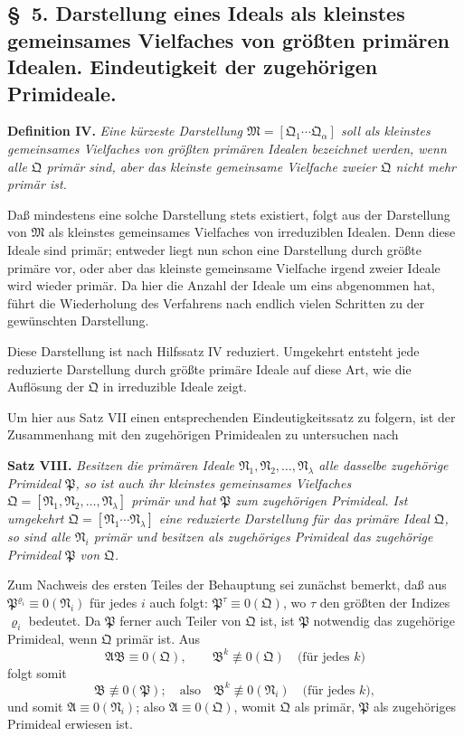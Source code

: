 \documentclass[11pt]{article}
\newcommand{\ideal}[1]{\mathfrak{#1}}
\begin{document}
\subsection*{\S~5. Darstellung eines Ideals als kleinstes gemeinsames Vielfaches von größten primären Idealen. Eindeutigkeit der zugehörigen Primideale.}

\textbf{Definition IV.} \emph{Eine kürzeste Darstellung $\ideal M=[\ideal Q_1\cdots\ideal Q_\alpha]$ soll als kleinstes gemeinsames Vielfaches von größten primären Idealen bezeichnet werden, wenn alle $\ideal Q$ primär sind, aber das kleinste gemeinsame Vielfache zweier $\ideal Q$ nicht mehr primär ist.}

Daß mindestens eine solche Darstellung stets existiert, folgt aus der Darstellung von $\ideal M$ als kleinstes gemeinsames Vielfaches von irreduziblen Idealen. Denn diese Ideale sind primär; entweder liegt nun schon eine Darstellung durch größte primäre vor, oder aber das kleinste gemeinsame Vielfache irgend zweier Ideale wird wieder primär. Da hier die Anzahl der Ideale um eins abgenommen hat, führt die Wiederholung des Verfahrens nach endlich vielen Schritten zu der gewünschten Darstellung.

Diese Darstellung ist nach Hilfssatz IV reduziert. Umgekehrt entsteht jede reduzierte Darstellung durch größte primäre Ideale auf diese Art, wie die Auflösung der $\ideal Q$ in irreduzible Ideale zeigt.

Um hier aus Satz VII einen entsprechenden Eindeutigkeitssatz zu folgern, ist der Zusammenhang mit den zugehörigen Primidealen zu untersuchen nach

\textbf{Satz VIII.} \emph{Besitzen die primären Ideale $\ideal N_1,\ideal N_2,\ldots,\ideal N_\lambda$ alle dasselbe zugehörige Primideal $\ideal P$, so ist auch ihr kleinstes gemeinsames Vielfaches $\ideal Q=[\ideal N_1,\ideal N_2,\ldots,\ideal N_\lambda]$ primär und hat $\ideal P$ zum zugehörigen Primideal. Ist umgekehrt $\ideal Q=[\ideal N_1\cdots\ideal N_\lambda]$ eine reduzierte Darstellung für das primäre Ideal $\ideal Q$, so sind alle $\ideal N_i$ primär und besitzen als zugehöriges Primideal das zugehörige Primideal $\ideal P$ von $\ideal Q$.}

Zum Nachweis des ersten Teiles der Behauptung sei zunächst bemerkt, daß aus $\ideal P^{\varrho_i}\equiv0(\ideal N_i)$ für jedes $i$ auch folgt: $\ideal P^\tau\equiv0(\ideal Q)$, wo $\tau$ den größten der Indizes $\varrho_i$ bedeutet. Da $\ideal P$ ferner auch Teiler von $\ideal Q$ ist, ist $\ideal P$ notwendig das zugehörige Primideal, wenn $\ideal Q$ primär ist. Aus
\[
 \ideal A\ideal B\equiv0(\ideal Q),\qquad
 \ideal B^k\not\equiv0(\ideal Q)\quad\text{(für jedes }k)
\]
folgt somit
\[
 \ideal B\not\equiv0(\ideal P);
 \quad\text{also}\quad
 \ideal B^k\not\equiv0(\ideal N_i)\quad\text{(für jedes }k),
\]
und somit $\ideal A\equiv0(\ideal N_i)$; also $\ideal A\equiv0(\ideal Q)$, womit $\ideal Q$ als primär, $\ideal P$ als zugehöriges Primideal erwiesen ist.
\end{document}

